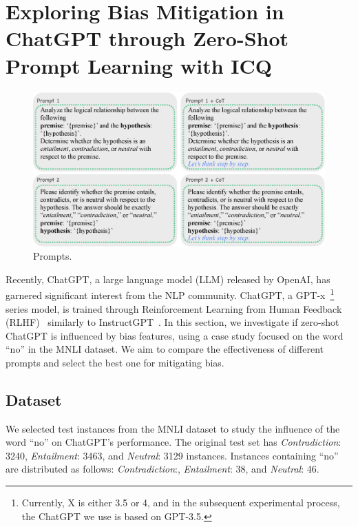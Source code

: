 \section{Exploring Bias Mitigation in ChatGPT through Zero-Shot Prompt Learning with ICQ}
\label{sec:mitigatingbiases}
\begin{figure}[th]
\centering
\includegraphics[width=\columnwidth]{picture/prompt.eps}
\caption{Prompts. }
\label{fig:prompt}
\end{figure}

Recently, ChatGPT, a large language model (LLM) released by OpenAI, has garnered significant interest 
from the NLP community.
ChatGPT, a GPT-x~\footnote{Currently, X is either 3.5 or 4, and in the subsequent experimental process, the ChatGPT we use is based on GPT-3.5.} series model, 
is trained through Reinforcement Learning from Human Feedback (RLHF)~\cite{christiano2017deep} similarly to InstructGPT~\cite{ouyang2022training}.
In this section, we investigate if zero-shot ChatGPT is influenced by bias features, using a case study focused on the word ``no'' in the MNLI dataset.
We aim to compare the effectiveness of different prompts and select the best one for mitigating bias. 

\subsection{Dataset}
\label{sec:chatgptdata}
We selected test instances from the MNLI dataset 
to study the influence of the word ``no'' on ChatGPT's performance. 
The original test set has \textit{Contradiction}: 3240, 
\textit{Entailment}: 3463, and \textit{Neutral}: 3129 instances. 
Instances containing ``no'' are distributed as follows: \textit{Contradiction}:, 
\textit{Entailment}: 38, and \textit{Neutral}: 46.

